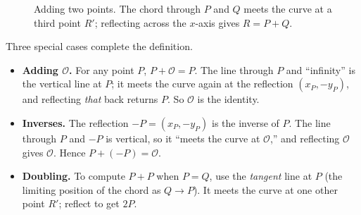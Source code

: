 \begin{figure}[H]
\centering
{}
\caption{Adding two points. The chord through $P$ and $Q$ meets the curve at a third
point $R'$; reflecting across the $x$-axis gives $R = P+Q$.}
\label{ch21:addition-fig}
\end{figure}

Three special cases complete the definition.

\begin{itemize}
  \item \textbf{Adding $\mathcal{O}$.} For any point $P$, $P + \mathcal{O} = P$. The
        line through $P$ and ``infinity'' is the vertical line at $P$; it meets the
        curve again at the reflection $(x_P,-y_P)$, and reflecting \emph{that} back
        returns $P$. So $\mathcal{O}$ is the identity.
  \item \textbf{Inverses.} The reflection $-P = (x_P, -y_P)$ is the inverse of $P$. The
        line through $P$ and $-P$ is vertical, so it ``meets the curve at $\mathcal{O}$,''
        and reflecting $\mathcal{O}$ gives $\mathcal{O}$. Hence $P + (-P) = \mathcal{O}$.
  \item \textbf{Doubling.} To compute $P + P$ when $P=Q$, use the \emph{tangent} line at
        $P$ (the limiting position of the chord as $Q \to P$). It meets the curve at one
        other point $R'$; reflect to get $2P$.
\end{itemize}

